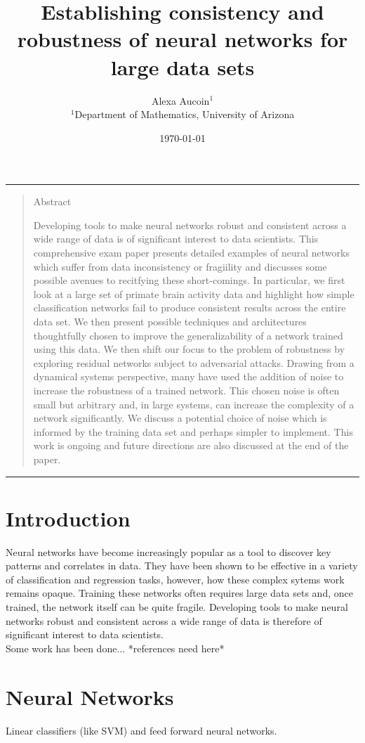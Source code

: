 \documentclass[12pt]{article}
\title{Establishing consistency and robustness of neural networks for large data sets}
\author{Alexa Aucoin$^{1}$ \\ \normalsize{$^{1}$Department of Mathematics, University of Arizona}}
\date{\today}
\newenvironment{sciabstract}{%
\begin{quote} \bf}
{\end{quote}}
\begin{document}
\maketitle

\hrule
\begin{sciabstract}
\begin{center} \large{Abstract}\end{center}
Developing tools to make neural networks robust and consistent across a wide range of data is of significant interest to data scientists. This comprehensive exam paper presents detailed examples of neural networks which suffer from data inconsistency or fragiility and discusses some possible avenues to recitfying these short-comings. In particular, we first look at a large set of primate brain activity data and highlight how simple classification networks fail to produce consistent results across the entire data set. We then present possible techniques and architectures thoughtfully chosen to improve the generalizability of a network trained using this data. We then shift our focus to the problem of robustness by exploring residual networks subject to adversarial attacks. Drawing from a dynamical systems perspective, many have used the addition of noise to increase the robustness of a trained network. This chosen noise is often small but arbitrary and, in large systems, can increase the complexity of a network significantly. We discuss a potential choice of noise which is informed by the training data set and perhaps simpler to implement. This work is ongoing and future directions are also discussed at the end of the paper.
\end{sciabstract}
\hrule

\section{Introduction}Neural networks have become increasingly popular as a tool to discover key patterns and correlates in data. They have been shown to be effective in a variety of classification and regression tasks, however, how these complex sytems work remains opaque. Training these networks often requires large data sets and, once trained, the network itself can be quite fragile. Developing tools to make neural networks robust and consistent across a wide range of data is therefore of significant interest to data scientists. \\
Some work has been done...
*references need here*

\section{Neural Networks}
Linear classifiers (like SVM) and feed forward neural networks.
\end{document}
